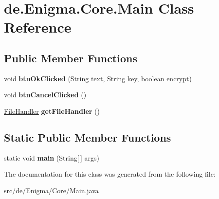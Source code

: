 \hypertarget{classde_1_1_enigma_1_1_core_1_1_main}{}\section{de.\+Enigma.\+Core.\+Main Class Reference}
\label{classde_1_1_enigma_1_1_core_1_1_main}
\subsection*{Public Member Functions}
\begin{DoxyCompactItemize}
\item 
\mbox{\label{classde_1_1_enigma_1_1_core_1_1_main_a310209f66ddc6fe17114f8a1f9c663ad}} 
void {\bfseries btn\+Ok\+Clicked} (String text, String key, boolean encrypt)
\item 
\mbox{\label{classde_1_1_enigma_1_1_core_1_1_main_afc8fb7733ef95bfd1e2d9ec1ece359bd}} 
void {\bfseries btn\+Cancel\+Clicked} ()
\item 
\mbox{\label{classde_1_1_enigma_1_1_core_1_1_main_a96ef5b0aee61943c2262e1af9c058cda}} 
\hyperlink{classde_1_1_enigma_1_1_util_1_1_file_handler}{File\+Handler} {\bfseries get\+File\+Handler} ()
\end{DoxyCompactItemize}
\subsection*{Static Public Member Functions}
\begin{DoxyCompactItemize}
\item 
\mbox{\label{classde_1_1_enigma_1_1_core_1_1_main_a4559f91709b046a087e2a20cce660464}} 
static void {\bfseries main} (String\mbox{[}$\,$\mbox{]} args)
\end{DoxyCompactItemize}


The documentation for this class was generated from the following file\+:\begin{DoxyCompactItemize}
\item 
src/de/\+Enigma/\+Core/Main.\+java\end{DoxyCompactItemize}
